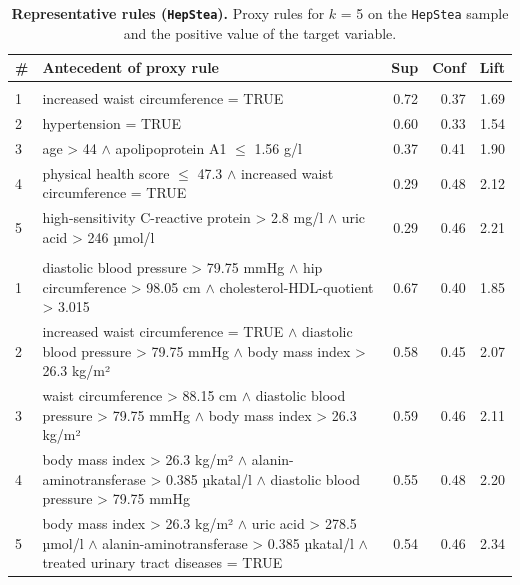 \documentclass[
  oneside]{book}
\begin{document}
\begin{table}

\caption{\label{tab:04-findings-hep-stea}\textbf{Representative rules (\texttt{HepStea}).} Proxy rules for \(k\) = 5 on the \texttt{HepStea} sample and the positive value of the target variable.}
\centering
\begin{tabular}[t]{l>{\raggedright\arraybackslash}p{10cm}rrr}
\toprule
\textbf{\#} & \textbf{Antecedent of proxy rule} & \textbf{Sup} & \textbf{Conf} & \textbf{Lift}\\
\midrule
\addlinespace[0.3em]
\multicolumn{5}{l}{\textbf{HotSpot}}\\
\hspace{1em}1 & increased waist circumference = TRUE & 0.72 & 0.37 & 1.69\\
\hspace{1em}2 & hypertension = TRUE & 0.60 & 0.33 & 1.54\\
\hspace{1em}3 & age > 44 $\wedge$ apolipoprotein A1 $\leq$ 1.56 g/l & 0.37 & 0.41 & 1.90\\
\hspace{1em}4 & physical health score $\leq$ 47.3 $\wedge$ increased waist circumference = TRUE & 0.29 & 0.48 & 2.12\\
\hspace{1em}5 & high-sensitivity C-reactive protein > 2.8 mg/l $\wedge$ uric acid > 246 µmol/l & 0.29 & 0.46 & 2.21\\
\addlinespace[0.3em]
\multicolumn{5}{l}{\textbf{SD-Map}}\\
\hspace{1em}1 & diastolic blood pressure > 79.75 mmHg $\wedge$ hip circumference > 98.05 cm $\wedge$ cholesterol-HDL-quotient > 3.015 & 0.67 & 0.40 & 1.85\\
\hspace{1em}2 & increased waist circumference = TRUE $\wedge$ diastolic blood pressure > 79.75 mmHg $\wedge$ body mass index > 26.3 kg/m² & 0.58 & 0.45 & 2.07\\
\hspace{1em}3 & waist circumference > 88.15 cm $\wedge$ diastolic blood pressure > 79.75 mmHg $\wedge$ body mass index > 26.3 kg/m² & 0.59 & 0.46 & 2.11\\
\hspace{1em}4 & body mass index > 26.3 kg/m² $\wedge$ alanin-aminotransferase > 0.385 µkatal/l $\wedge$ diastolic blood pressure > 79.75 mmHg & 0.55 & 0.48 & 2.20\\
\hspace{1em}5 & body mass index > 26.3 kg/m² $\wedge$ uric acid > 278.5 µmol/l $\wedge$ alanin-aminotransferase > 0.385 µkatal/l $\wedge$ treated urinary tract diseases = TRUE & 0.54 & 0.46 & 2.34\\
\bottomrule
\end{tabular}
\end{table}
\end{document}

